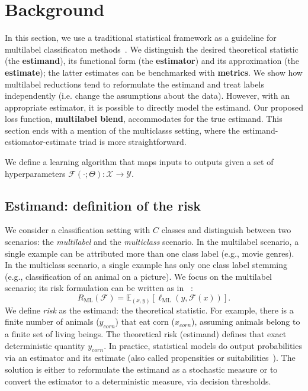 
\section{Background}
\label{section:background}

In this section, we use a traditional statistical framework as a guideline for multilabel classificaton methods~\citep{tukey}. We distinguish the desired theoretical statistic (the \textbf{estimand}), its functional form (the \textbf{estimator}) and its approximation (the \textbf{estimate}); the latter estimates can be benchmarked with \textbf{metrics}. We show how multilabel reductions tend to reformulate the estimand and treat labels independently (i.e. change the assumptions about the data). However, with an appropriate estimator, it is possible to directly model the estimand. Our proposed loss function, \textbf{multilabel blend}, accommodates for the true estimand. This section ends with a mention of the multiclasss setting, where the estimand-estiomator-estimate triad is more straightforward.

We define a learning algorithm that maps inputs to outputs given a set of hyperparameters \(\mathcal{F}(\cdot ; \Theta): \mathcal{X} \rightarrow \mathcal{Y}\). 

\subsection{Estimand: definition of the risk}
\label{section:background:estimand}

We consider a classification setting with $C$ classes and distinguish between two scenarios: the \emph{multilabel} and the \emph{multiclass} scenario. 
In the multilabel scenario, a single example can be attributed more than one class label (e.g., movie genres). 
In the multiclass scenario, a single example has only one class label stemming (e.g., classification of an animal on a picture). 
We focus on the multilabel scenario; its risk formulation can be written as in ~\citep{multilabelReduction}:
%
\begin{equation}
R_{\mathrm{ML}}(\mathcal{F}) = \mathbb{E}_{(x, y)}\left[\ell_{\mathrm{ML}}(y, \mathcal{F}(x))\right].
\end{equation}
%
We define \emph{risk} as the estimand: the theoretical statistic. For example, there is a finite number of animals ($y_{corn}$) that eat corn ($x_{corn}$), assuming animals belong to a finite set of living beings. The theoretical risk (estimand) defines that exact deterministic quantity $y_{corn}$. In practice, statistical models do output probabilities via an estimator and its estimate (also called propensities or suitabilities~\citep{multilabelReduction}). The solution  is either to reformulate the estimand as a stochastic measure or to convert the estimator to a deterministic measure, via decision thresholds.

